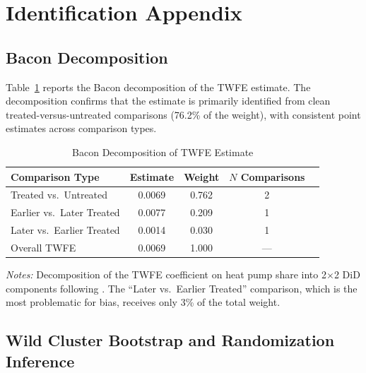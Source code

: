 \documentclass[12pt]{article}
\begin{document}
\section{Identification Appendix}

\subsection{Bacon Decomposition}

Table~\ref{tab:bacon} reports the Bacon decomposition of the TWFE estimate. The decomposition confirms that the estimate is primarily identified from clean treated-versus-untreated comparisons (76.2\% of the weight), with consistent point estimates across comparison types.

\begin{table}[H]
\centering
\caption{Bacon Decomposition of TWFE Estimate}
\label{tab:bacon}
\begin{tabular}{lcccc}
\toprule
Comparison Type & Estimate & Weight & $N$ Comparisons \\
\midrule
Treated vs.\ Untreated & 0.0069 & 0.762 & 2 \\
Earlier vs.\ Later Treated & 0.0077 & 0.209 & 1 \\
Later vs.\ Earlier Treated & 0.0014 & 0.030 & 1 \\
\midrule
Overall TWFE & 0.0069 & 1.000 & --- \\
\bottomrule
\end{tabular}
\begin{minipage}{0.85\textwidth}
\vspace{6pt}
\footnotesize
\textit{Notes:} Decomposition of the TWFE coefficient on heat pump share into 2$\times$2 DiD components following \citet{goodman2021difference}. The ``Later vs.\ Earlier Treated'' comparison, which is the most problematic for bias, receives only 3\% of the total weight.
\end{minipage}
\end{table}


\subsection{Wild Cluster Bootstrap and Randomization Inference}
\end{document}
